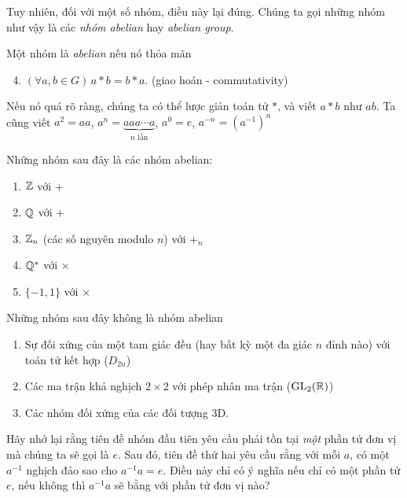 Tuy nhiên, đối với một số nhóm, điều này lại đúng. Chúng ta gọi những nhóm như vậy là các \emph{nhóm abelian} hay \emph{abelian group}.
\begin{defi}
  Một nhóm là \emph{abelian} nếu nó thỏa mãn
  \begin{enumerate}[label=\arabic{*}.]
      \setcounter{enumi}{3}
    \item $(\forall a, b \in G)\, a*b = b*a$. \hfill (giao hoán - commutativity)
  \end{enumerate}
\end{defi}

Nếu nó quá rõ ràng, chúng ta có thể lược giản toán tử $*$, và viết $a*b$ như $ab$. Ta cũng viết $a^2 = aa$, $a^n = \underbrace{aaa\cdots a}_{n \text{ lần}}$, $a^0 = e$, $a^{-n} = (a^{-1})^n$
\begin{eg}
  Những nhóm sau đây là các nhóm abelian:
  \begin{enumerate}
    \item $\mathbb{Z}$ với $+$
    \item $\mathbb{Q}$ với $+$
    \item $\mathbb{Z}_n$ (các số nguyên modulo $n$) với $+_n$
    \item $\mathbb{Q}^*$ với $\times$
    \item $\{-1, 1\}$ với $\times$
  \end{enumerate}
  Những nhóm sau đây không là nhóm abelian
  \begin{enumerate}[resume]
    \item Sự đối xứng của một tam giác đều (hay bất kỳ một đa giác $n$ đỉnh nào) với toán tử kết hợp ($D_{2n}$)
    \item Các ma trận khả nghịch $2\times 2$ với phép nhân ma trận ($\mathrm{GL}_2(\mathbb{R})$)
    \item Các nhóm đối xứng của các đối tượng 3D.
  \end{enumerate}
\end{eg}

Hãy nhớ lại rằng tiên đề nhóm đầu tiên yêu cầu phải tồn tại \emph{một} phần tử đơn vị mà chúng ta sẽ gọi là $e$. Sau đó, tiên đề thứ hai yêu cầu rằng với mỗi $a$, có một $a^{-1}$ nghịch đảo sao cho $a^{-1}a = e$. Điều này chỉ có ý nghĩa nếu chỉ có một phần tử $e$, nếu không thì $a^{-1}a$ sẽ bằng với phần tử đơn vị nào?

